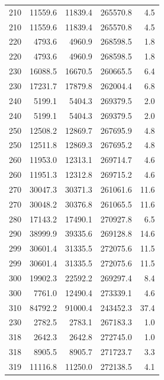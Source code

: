 \begin{longtable}{rrrrr}
    210 & \num{11559.6} & \num{11839.4} & \num{265570.8} & 4.5 \\
    210 & \num{11559.6} & \num{11839.4} & \num{265570.8} & 4.5 \\
    220 & \num{4793.6} & \num{4960.9} & \num{268598.5} & 1.8 \\
    220 & \num{4793.6} & \num{4960.9} & \num{268598.5} & 1.8 \\
    230 & \num{16088.5} & \num{16670.5} & \num{260665.5} & 6.4 \\
    230 & \num{17231.7} & \num{17879.8} & \num{262004.4} & 6.8 \\
    240 & \num{5199.1} & \num{5404.3} & \num{269379.5} & 2.0 \\
    240 & \num{5199.1} & \num{5404.3} & \num{269379.5} & 2.0 \\
    250 & \num{12508.2} & \num{12869.7} & \num{267695.9} & 4.8 \\
    250 & \num{12511.8} & \num{12869.3} & \num{267695.2} & 4.8 \\
    260 & \num{11953.0} & \num{12313.1} & \num{269714.7} & 4.6 \\
    260 & \num{11951.3} & \num{12312.8} & \num{269715.2} & 4.6 \\
    270 & \num{30047.3} & \num{30371.3} & \num{261061.6} & 11.6 \\
    270 & \num{30048.2} & \num{30376.8} & \num{261065.5} & 11.6 \\
    280 & \num{17143.2} & \num{17490.1} & \num{270927.8} & 6.5 \\
    290 & \num{38999.9} & \num{39335.6} & \num{269128.8} & 14.6 \\
    299 & \num{30601.4} & \num{31335.5} & \num{272075.6} & 11.5 \\
    299 & \num{30601.4} & \num{31335.5} & \num{272075.6} & 11.5 \\
    300 & \num{19902.3} & \num{22592.2} & \num{269297.4} & 8.4 \\
    300 & \num{7761.0} & \num{12490.4} & \num{273339.1} & 4.6 \\
    310 & \num{84792.2} & \num{91000.4} & \num{243452.3} & 37.4 \\
    230 & \num{2782.5} & \num{2783.1} & \num{267183.3} & 1.0 \\
    318 & \num{2642.3} & \num{2642.8} & \num{272745.0} & 1.0 \\
    318 & \num{8905.5} & \num{8905.7} & \num{271723.7} & 3.3 \\
    319 & \num{11116.8} & \num{11250.0} & \num{272138.5} & 4.1 \\

\end{longtable}
